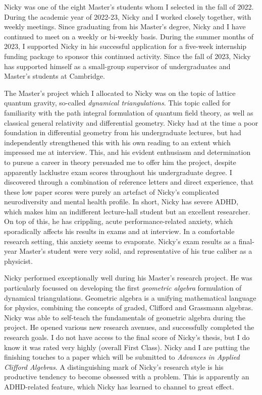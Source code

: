 Nicky was one of the eight Master's students whom I selected in the fall of 2022. During the academic year of 2022-23, Nicky and I worked closely together, with weekly meetings. Since graduating from his Master's degree, Nicky and I have continued to meet on a weekly or bi-weekly basis. During the summer months of 2023, I supported Nicky in his successful application for a five-week internship funding package to sponsor this continued activity. Since the fall of 2023, Nicky has supported himself as a small-group supervisor of undergraduates and Master's students at Cambridge.

The Master's project which I allocated to Nicky was on the topic of lattice quantum gravity, so-called \emph{dynamical triangulations}. This topic called for familiarity with the path integral formulation of quantum field theory, as well as classical general relativity and differential geometry. Nicky had at the time a poor foundation in differential geometry from his undergraduate lectures, but had independently strengthened this with his own reading to an extent which impressed me at interview. This, and his evident enthusiasm and determination to pursue a career in theory persuaded me to offer him the project, despite apparently lacklustre exam scores throughout his undergraduate degree. I discovered through a combination of reference letters and direct experience, that these low paper scores were purely an artefact of Nicky's complicated neurodiversity and mental health profile. In short, Nicky has severe ADHD, which makes him an indifferent lecture-hall student but an excellent researcher. On top of this, he has crippling, acute performance-related anxiety, which sporadically affects his results in exams and at interview. In a comfortable research setting, this anxiety seems to evaporate. Nicky's exam results as a final-year Master's student were very solid, and representative of his true caliber as a physicist.

Nicky performed exceptionally well during his Master's research project. He was particularly focussed on developing the first \emph{geometric algebra} formulation of dynamical triangulations. Geometric algebra is a unifying mathematical language for physics, combining the concepts of graded, Clifford and Grassmann algebras. Nicky was able to self-teach the fundamentals of geometric algebra during the project. He opened various new research avenues, and successfully completed the research goals. I do not have access to the final score of Nicky's thesis, but I do know it was rated very highly (overall First Class). Nicky and I are putting the finishing touches to a paper which will be submitted to \emph{Advances in Applied Clifford Algebras}. A distinguishing mark of Nicky's research style is his productive tendency to become obsessed with a problem. This is apparently an ADHD-related feature, which Nicky has learned to channel to great effect.

